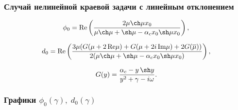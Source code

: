 \documentclass[fullscreen=true, unicode, bookmarks=false]{beamer}
\begin{document}
\begin{frame}
\frametitle {Случай нелинейной краевой задачи с линейным отклонением }

$$ \phi_0 = \operatorname{Re} \left( \frac{ 2 \mu \ch \mu x_0 }{ \mu \ch \mu +\sh \mu - \alpha_c x_0 \sh \mu x_0 } \right), $$

$$ d_0 = \operatorname{Re} \left( \frac{ 3 \mu ( G(\mu + 2\,\mbox{Re}\mu) + G(\mu + 2i\,\mbox{Im}\mu) + 2G(\overline{\mu}) ) }{ 2 ( \mu \ch \mu +\sh \mu - \alpha_c x_0 \sh \mu x_0 ) } \right), $$

$$ G(y) = \frac{ \alpha_c - y\,\sh y }{ y^2 + \gamma - i\omega }. $$

\end{frame}

\begin{frame}
\frametitle { Графики $ \phi_0(\gamma), \; d_0(\gamma) $ }


\end{frame}
\end{document}

